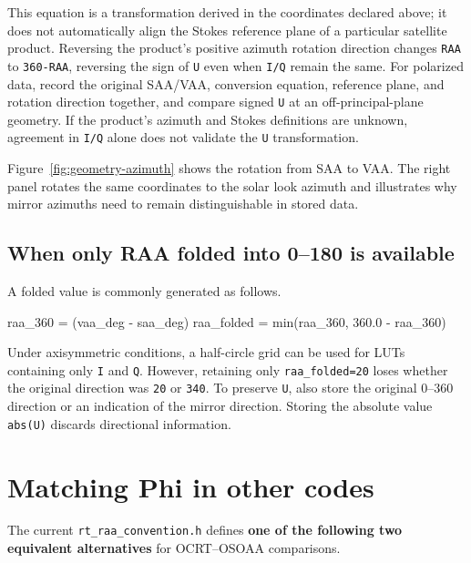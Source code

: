 This equation is a transformation derived in the coordinates declared above; it does not automatically align the Stokes reference plane of a particular satellite product. Reversing the product's positive azimuth rotation direction changes \texttt{RAA} to \texttt{360-RAA}, reversing the sign of \texttt{U} even when \texttt{I/\allowbreak{}Q} remain the same. For polarized data, record the original SAA/VAA, conversion equation, reference plane, and rotation direction together, and compare signed \texttt{U} at an off-principal-plane geometry. If the product's azimuth and Stokes definitions are unknown, agreement in \texttt{I/\allowbreak{}Q} alone does not validate the \texttt{U} transformation.

Figure~\ref{fig:geometry-azimuth} shows the rotation from SAA to VAA. The right panel rotates the same coordinates to the solar look azimuth and illustrates why mirror azimuths need to remain distinguishable in stored data.



\subsection{When only RAA folded into 0--180\textdegree{} is available}
\label{sec:auto:01_concepts_geometry:4.2}
A folded value is commonly generated as follows.


\begin{ManualCode}
raa_360 = (vaa_deg - saa_deg) %
raa_folded = min(raa_360, 360.0 - raa_360)
\end{ManualCode}

Under axisymmetric conditions, a half-circle grid can be used for LUTs containing only \texttt{I} and \texttt{Q}. However, retaining only \texttt{raa\_\allowbreak{}folded=\allowbreak{}20\textdegree{}} loses whether the original direction was \texttt{20\textdegree{}} or \texttt{340\textdegree{}}. To preserve \texttt{U}, also store the original 0--360\textdegree{} direction or an indication of the mirror direction. Storing the absolute value \texttt{abs(U)} discards directional information.

\section{Matching Phi in other codes}
\label{sec:auto:01_concepts_geometry:5}
The current \texttt{rt\_\allowbreak{}raa\_\allowbreak{}convention.\allowbreak{}h} defines \textbf{one of the following two equivalent alternatives} for OCRT--OSOAA comparisons.


